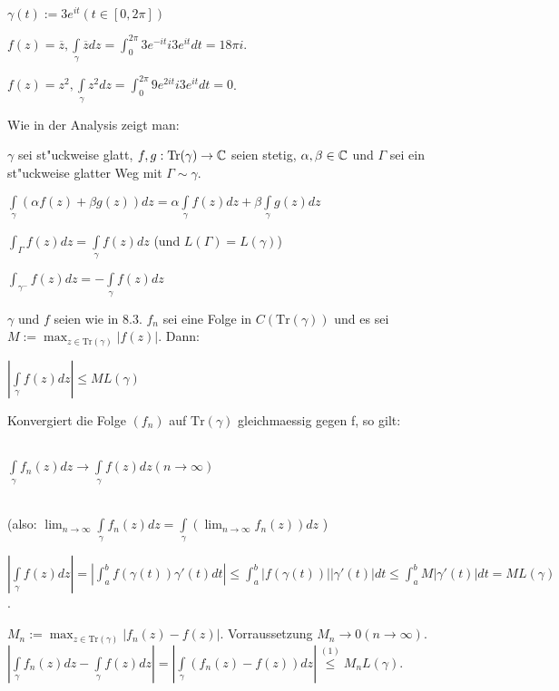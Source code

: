 \documentclass[a4paper,twoside,DIV15,BCOR12mm]{scrbook}
\def\Tr{\text{Tr}}
\def\wegint{\ensuremath{\int\limits_\gamma}}
\def\iint{\ensuremath{\int\limits}}
\begin{document}
\begin{beispiel}
$\gamma(t):=3e^{it}(t\in[0,2\pi])$ 
 \begin{liste}
 \item $f(z)=\overline{z},\wegint \overline{z}dz=\iint_0^{2\pi} 3e^{-it}i3e^{it}dt=18\pi i$.
 \item $f(z)=z^2,\wegint z^2dz=\iint_0^{2\pi} 9e^{2it}i3e^{it}dt=0$.
 \end{liste}
\end{beispiel}

Wie in der Analysis zeigt man:


\begin{samepage}\begin{satz}
$\gamma$ sei st"uckweise glatt, $f,g:\Tr(\gamma)\to\MdC$ seien stetig, $\alpha,\beta\in\mathbb{C}$ und $\Gamma$ sei ein st"uckweise glatter Weg mit $\Gamma \sim \gamma$.
 \begin{liste}
  \item $\wegint(\alpha f(z)+\beta g(z))dz=\alpha\wegint f(z)dz + \beta\wegint g(z)dz$
  \item $\iint_\Gamma f(z)dz=\wegint f(z)dz$ (und $L(\Gamma) = L(\gamma)$)
  \item $\iint_{\gamma^-}f(z)dz=-\wegint f(z)dz$
 \end{liste}
\end{satz}\end{samepage}


\begin{samepage}
\begin{satz}
$\gamma$ und $f$ seien wie in 8.3. $f_n$ sei eine Folge in $C(\Tr(\gamma))$ und es sei $M:=\max_{z\in\Tr(\gamma)}|f(z)|$. Dann: 
\begin{liste}
\item $|\wegint f(z)dz| \le M L(\gamma)$\\
\item Konvergiert die Folge $(f_n)$ auf $\Tr(\gamma)$ gleichmaessig gegen f, so gilt: \\ \\ 
\centerline{$\wegint f_n(z)dz \to\wegint f(z)dz (n\to\infty)$}\\
(also: $\lim_{n\to\infty}\wegint f_n(z)dz = \wegint(\lim_{n\to\infty}f_n(z))dz$ )
\end{liste}
\end{satz}
\end{samepage}

\begin{beweis}
\begin{liste}
   \item $|\wegint f(z)dz| = |\iint_a^bf(\gamma(t))\gamma'(t)dt|\le \iint_a^b|f(\gamma(t))||\gamma'(t)|dt\le\iint_a^b M |\gamma'(t)|dt=M L(\gamma)$.
   \item $M_n:=\max_{z\in\Tr(\gamma)}|f_n(z)-f(z)|$. Vorraussetzung \folgt $M_n\to 0(n\to\infty)$.\\
        $|\wegint f_n(z)dz-\wegint f(z)dz|=|\wegint(f_n(z)-f(z))dz| \stackrel{(1)}{\leq} M_n L(\gamma)$.
\end{liste}
\end{beweis}
\end{document}
